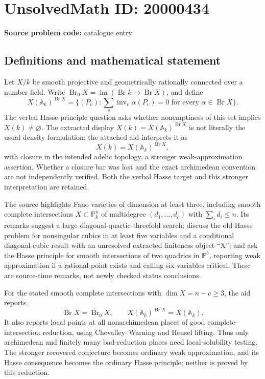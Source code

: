\documentclass[11pt]{article}
\newcommand{\A}{\mathbb{A}}
\newcommand{\PP}{\mathbb{P}}
\begin{document}
\section*{UnsolvedMath ID: 20000434}
\textbf{Source problem code:} catalogue entry
\subsection{Definitions and mathematical statement}
Let \(X/k\) be smooth projective and geometrically rationally connected over a number field. Write \(\operatorname{Br}_0X=\operatorname{im}(\operatorname{Br}k\to\operatorname{Br}X)\), and define
\[
X(\A_k)^{\operatorname{Br}X}=
\{(P_v):\sum_v\operatorname{inv}_v\alpha(P_v)=0
\text{ for every }\alpha\in\operatorname{Br}X\}.
\]
The verbal Hasse-principle question asks whether nonemptiness of this set implies \(X(k)\ne\varnothing\). The extracted display \(X(k)=X(\A_k)^{\operatorname{Br}X}\) is not literally the usual density formulation; the attached aid interprets it as
\[
\overline{X(k)}=X(\A_k)^{\operatorname{Br}X},
\]
with closure in the intended adelic topology, a stronger weak-approximation assertion. Whether a closure bar was lost and the exact archimedean convention are not independently verified. Both the verbal Hasse target and this stronger interpretation are retained.

The source highlights Fano varieties of dimension at least three, including smooth complete intersections \(X\subset\PP^n_k\) of multidegree \((d_1,\ldots,d_c)\) with \(\sum_i d_i\leq n\). Its remarks suggest a large diagonal-quartic-threefold search; discuss the old Hasse problem for nonsingular cubics in at least five variables and a conditional diagonal-cubic result with an unresolved extracted finiteness object ``X''; and ask the Hasse principle for smooth intersections of two quadrics in \(\PP^5\), reporting weak approximation if a rational point exists and calling six variables critical. These are source-time remarks, not newly checked status conclusions.

For the stated smooth complete intersections with \(\dim X=n-c\geq3\), the aid reports
\[
\operatorname{Br}X=\operatorname{Br}_0X,
\qquad X(\A_k)^{\operatorname{Br}X}=X(\A_k).
\]
It also reports local points at all nonarchimedean places of good complete-intersection reduction, using Chevalley--Warning and Hensel lifting. Thus only archimedean and finitely many bad-reduction places need local-solubility testing. The stronger recovered conjecture becomes ordinary weak approximation, and its Hasse consequence becomes the ordinary Hasse principle; neither is proved by this reduction.
\end{document}
